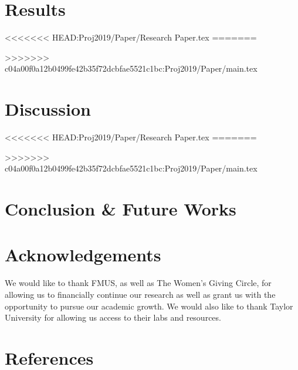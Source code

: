 \documentclass{article}
\begin{document}
%
%
\section{Results}
<<<<<<< HEAD:Proj2019/Paper/Research Paper.tex
\justify
=======


>>>>>>> c04a00f0a12b0499fe42b35f72dcbfae5521c1bc:Proj2019/Paper/main.tex
%
%
\section{Discussion}
<<<<<<< HEAD:Proj2019/Paper/Research Paper.tex
\justify
=======


>>>>>>> c04a00f0a12b0499fe42b35f72dcbfae5521c1bc:Proj2019/Paper/main.tex
%
%
\section{Conclusion \& Future Works}


%
%
\section{Acknowledgements}


We would like to thank FMUS, as well as The Women’s Giving Circle, for allowing us to financially continue our research as well as grant us with the opportunity to pursue our  academic growth. We would also like to thank Taylor University for allowing us access to their labs and resources. \cite{bbcCompression95} \par

%
%
\section{References}




\end{document}
